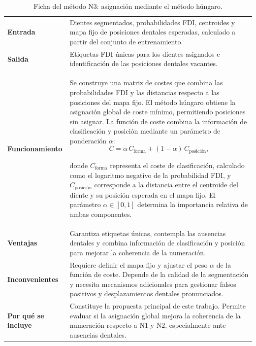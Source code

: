 \begin{table}[htbp]
    \centering
    \begin{tabular}{p{} >{\raggedright\arraybackslash}p{}}
        \hline
         \textbf{Entrada} &  
         Dientes segmentados, probabilidades FDI, centroides y mapa fijo de posiciones dentales esperadas, calculado a partir del conjunto de entrenamiento. \\
         
         \textbf{Salida} &
         Etiquetas FDI únicas para los dientes asignados e identificación de las posiciones dentales vacantes. \\

         \textbf{Funcionamiento} &
         Se construye una matriz de costes que combina las probabilidades FDI y las distancias respecto a las posiciones del mapa fijo. El método húngaro \cite{kuhnHungarianMethodAssignment1955} obtiene la asignación global de coste mínimo, permitiendo posiciones sin asignar. La función de coste combina la información de clasificación y posición mediante un parámetro de ponderación $\alpha$:
         \[
         C = \alpha\, C_{\text{forma}} + (1-\alpha)\, C_{\text{posición}},
         \]
         
         donde $C_{\text{forma}}$ representa el coste de clasificación, calculado como el logaritmo negativo de la probabilidad FDI, y $C_{\text{posición}}$ corresponde a la distancia entre el centroide del diente y su posición esperada en el mapa fijo. El parámetro $\alpha \in [0, 1]$ determina la importancia relativa de ambas componentes.\\

         \textbf{Ventajas} &
         Garantiza etiquetas únicas, contempla las ausencias dentales y combina información de clasificación y posición para mejorar la coherencia de la numeración. \\

         \textbf{Inconvenientes} &
         Requiere definir el mapa fijo y ajustar el peso $\alpha$ de la función de coste. Depende de la calidad de la segmentación y necesita mecanismos adicionales para gestionar falsos positivos y desplazamientos dentales pronunciados. \\

         \textbf{Por qué se incluye} &
         Constituye la propuesta principal de este trabajo. Permite evaluar si la asignación global mejora la coherencia de la numeración respecto a N1 y N2, especialmente ante ausencias dentales. \\
         \hline
    \end{tabular} 
    \caption{Ficha del método N3: asignación mediante el método húngaro.}
    \label{tab:metodo-n3}
\end{table}

